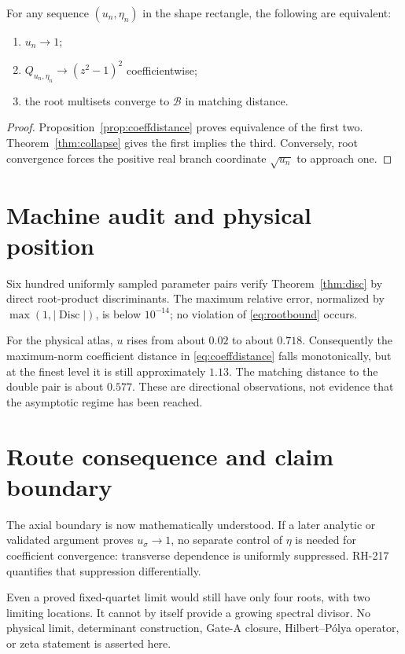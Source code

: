 \documentclass[12pt]{article}
\theoremstyle{remark}\newtheorem{remark}[theorem]{Remark}
\begin{document}
\begin{corollary}\label{cor:equiv}
For any sequence $(u_n,\eta_n)$ in the shape rectangle, the following are
equivalent:
\begin{enumerate}[leftmargin=2em]
\item $u_n\to1$;
\item $Q_{u_n,\eta_n}\to(z^2-1)^2$ coefficientwise;
\item the root multisets converge to $\mathcal B$ in matching distance.
\end{enumerate}
\end{corollary}
\begin{proof}
Proposition~\ref{prop:coeffdistance} proves equivalence of the first two.
Theorem~\ref{thm:collapse} gives the first implies the third.  Conversely,
root convergence forces the positive real branch coordinate
$\sqrt{u_n}$ to approach one.
\end{proof}

\section{Machine audit and physical position}

Six hundred uniformly sampled parameter pairs verify
Theorem~\ref{thm:disc} by direct root-product discriminants.  The maximum
relative error, normalized by $\max(1,|\operatorname{Disc}|)$, is below
$10^{-14}$; no violation of \eqref{eq:rootbound} occurs.

For the physical atlas, $u$ rises from about $0.02$ to about $0.718$.
Consequently the maximum-norm coefficient distance in
\eqref{eq:coeffdistance} falls monotonically, but at the finest level it is
still approximately $1.13$.  The matching distance to the double pair is
about $0.577$.  These are directional observations, not evidence that the
asymptotic regime has been reached.

\section{Route consequence and claim boundary}

The axial boundary is now mathematically understood.  If a later analytic or
validated argument proves $u_\sigma\to1$, no separate control of $\eta$ is
needed for coefficient convergence: transverse dependence is uniformly
suppressed.  RH-217 quantifies that suppression differentially.

Even a proved fixed-quartet limit would still have only four roots, with two
limiting locations.  It cannot by itself provide a growing spectral divisor.
No physical limit, determinant construction, Gate-A closure, Hilbert--P\'olya
operator, or zeta statement is asserted here.


\end{document}
